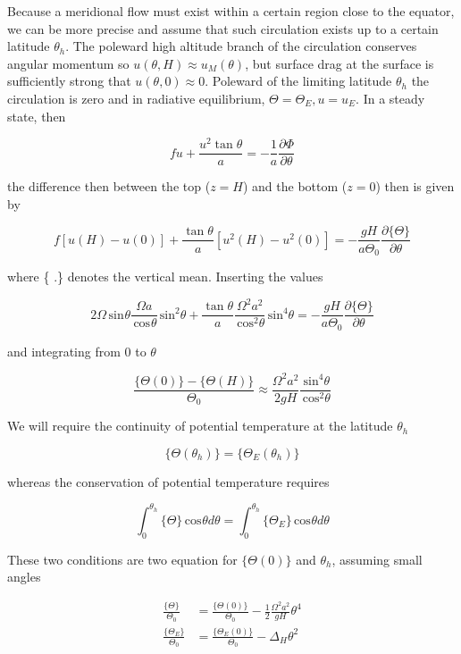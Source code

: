 Because a meridional flow must exist within a certain region close to
the equator, we can be more precise and assume that such circulation
exists up to a certain latitude \(\theta_h\). The poleward high altitude
branch of the circulation conserves angular momentum so
\(u(\theta, H) \approx u_M(\theta)\), but surface drag at the surface is
sufficiently strong that \(u(\theta,0) \approx 0\). Poleward of the
limiting latitude \(\theta_h\) the circulation is zero and in radiative
equilibrium, \(\Theta = \Theta_E, u=u_E\). In a steady state, then

\[f u + \frac{u^2 \tan\theta}{a} = -\frac{1}{a}\frac{\partial \Phi}{\partial \theta}\]

the difference then between the top (\(z=H\)) and the bottom (\(z=0\))
then is given by

\[f[u(H)-u(0)] + \frac{\tan\theta}{a}[u^2(H) - u^2(0)] = -\frac{gH}{a\Theta_0}\frac{\partial \{ \Theta\} }{\partial \theta}\]

where \{ .\} denotes the vertical mean. Inserting the values

\[2\Omega \,\mathrm{sin}^{} \theta \frac{\Omega a}{\,\mathrm{cos}^{} \theta} \,\mathrm{sin}^{2} \theta + \frac{\tan\theta}{a}\frac{\Omega^2 a^2}{\,\mathrm{cos}^{2} \theta} \,\mathrm{sin}^{4} \theta = -\frac{gH}{a\Theta_0}\frac{\partial \{ \Theta\} }{\partial \theta}\]

and integrating from 0 to \(\theta\)

\[\frac{\{ \Theta(0)\} -  \{ \Theta(H)\} }{\Theta_0}\approx \frac{\Omega^2a^2}{2gH}\frac{\,\mathrm{sin}^{4} \theta}{\,\mathrm{cos}^{2} \theta}\]

We will require the continuity of potential temperature at the latitude
\(\theta_h\)

\[\{ \Theta(\theta_h)\} = \{ \Theta_E(\theta_h)\}\]

whereas the conservation of potential temperature requires

\[\int_0^{\theta_h} \{ \Theta\} \,\mathrm{cos}^{} \theta d\theta = \int_0^{\theta_h} \{ \Theta_E\} \,\mathrm{cos}^{} \theta d\theta\]

These two conditions are two equation for \(\{ \Theta(0)\}\) and
\(\theta_h\), assuming small angles

\[\begin{aligned}
\frac{\{ \Theta\} }{\Theta_0} &= \frac{\{ \Theta(0)\} }{\Theta_0}   -\frac{1}{2}\frac{\Omega^2a^2}{gH}\theta^4\\
\frac{\{ \Theta_E\} }{\Theta_0} &= \frac{\{ \Theta_E(0)\} }{\Theta_0} -\Delta_H \theta^2
\end{aligned}\]

